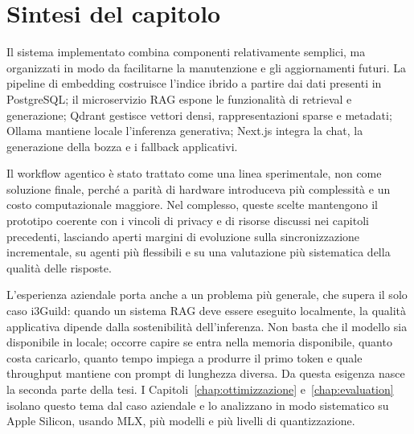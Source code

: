 \section{Sintesi del capitolo}
\label{sec:implementation_summary}

Il sistema implementato combina componenti relativamente semplici, ma organizzati 
in modo da facilitarne la manutenzione e gli aggiornamenti futuri. La pipeline di 
embedding costruisce l'indice ibrido a partire dai dati presenti in PostgreSQL; il
microservizio RAG espone le funzionalità di retrieval e generazione; Qdrant 
gestisce vettori densi, rappresentazioni sparse e metadati; Ollama mantiene 
locale l'inferenza generativa; Next.js integra la chat, la generazione della 
bozza e i fallback applicativi.

Il workflow agentico è stato trattato come una linea 
sperimentale, non come soluzione finale, perché a parità di hardware 
introduceva più complessità e un costo computazionale maggiore. Nel 
complesso, queste scelte mantengono il prototipo coerente con i vincoli 
di privacy e di risorse discussi nei capitoli precedenti, lasciando aperti 
margini di evoluzione sulla sincronizzazione incrementale, su agenti più 
flessibili e su una valutazione più sistematica della qualità delle risposte.

L'esperienza aziendale porta anche a un problema più generale, che supera il
solo caso i3Guild: quando un sistema RAG deve essere eseguito localmente, la
qualità applicativa dipende dalla sostenibilità dell'inferenza. Non basta che
il modello sia disponibile in locale; occorre capire se entra nella memoria
disponibile, quanto costa caricarlo, quanto tempo impiega a produrre il primo
token e quale throughput mantiene con prompt di lunghezza diversa. Da questa
esigenza nasce la seconda parte della tesi. I Capitoli~\ref{chap:ottimizzazione}
e~\ref{chap:evaluation} isolano questo tema dal caso aziendale e lo analizzano in
modo sistematico su Apple Silicon, usando MLX, più modelli e più livelli di
quantizzazione.
